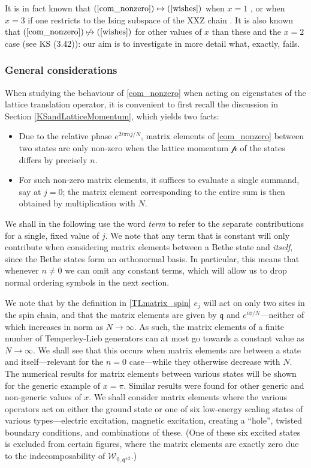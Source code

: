 \documentclass[a4paper,10pt]{article}
\newcommand{\q}{\mathfrak{q}}
\newcommand{\linnea}[1]{$\framebox{\tiny L}$\ \textbf{\texttt{{\color{red}\footnotesize#1}}}}
\newcommand{\aSt}{\mathcal{W}}
\newcommand{\AStTL}[2]{\aSt_{#1,#2}}
\newcommand{\Pscaled}{{\mathcal p}}
\begin{document}
%
%
It is in fact known that $(\ref{com_nonzero}) \mapsto (\ref{wishes})$ when  $x=1$ \cite{GRS1}, or when  $x=3$ if one restricts to the Ising subspace of the XXZ chain \cite{KooSaleur}. 
It is also known that  $(\ref{com_nonzero}) \not\mapsto (\ref{wishes})$ for other values of $x$  than these and the $x=2$ case (see KS (3.42)): our aim is to investigate in more detail what, exactly, fails.



\subsubsection*{General considerations}


When studying the behaviour of \eqref{com_nonzero} when acting on eigenstates of the lattice translation operator, it is convenient to first recall the discussion in Section \ref{KSandLatticeMomentum}, which yields two facts: 
\begin{itemize}
\item Due to the relative phase $e^{2i\pi nj/N}$, matrix elements of \eqref{com_nonzero} between two states are only non-zero when the lattice momentum $\Pscaled$ of the states differs by precisely $n$.
\item For such non-zero matrix elements, it suffices to evaluate a single summand, say at $j=0$; the matrix element corresponding to the entire sum is then obtained by multiplication with $N$.
\end{itemize}
We shall in the following use the word \emph{term} to refer to the separate contributions for a single, fixed value of $j$. We note that any term that is constant will only contribute when considering matrix elements between a Bethe state and \emph{itself}, since the Bethe states form an orthonormal basis. In particular, this means that whenever $n\neq 0$ we can omit any constant terms, which will allow us to drop normal ordering symbols in the next section. 

We note that by the definition in \eqref{TLmatrix_spin} $e_j$ will act on only two sites in the spin chain, and that the matrix elements are given by $\q$ and $e^{i\phi/N}$---neither of which increases in norm as $N\rightarrow \infty$. As such, the matrix elements of a finite number of Temperley-Lieb generators can at most go towards a constant value as $N \rightarrow \infty$. We shall see that this occurs when matrix elements are between a state and itself---relevant for the $n=0$ case---while they otherwise decrease with $N$. %
%
The numerical results for matrix elements between various states will be shown for the generic example of $x=\pi$. Similar results were found for other generic and non-generic values of $x$. We shall consider matrix elements where the various operators act on either the ground state or one of six low-energy scaling states of various types---electric excitation, magnetic excitation, creating a ``hole'', twisted boundary conditions, and combinations of these. (One of these six excited states is excluded from certain figures, where the matrix elements are exactly zero due to the indecomposability of $\AStTL{0}{\q^{\pm2}}$.)
 
\end{document}
